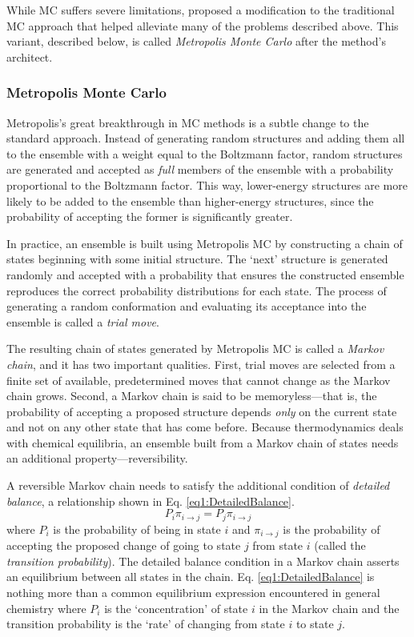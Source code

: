 While MC suffers severe limitations,
\citeauthor{Metropolis_JChemPhys_1953_v21_p1087} proposed a modification to the
traditional MC approach that helped alleviate many of the problems described
above. \cite{Metropolis_JChemPhys_1953_v21_p1087} This variant, described below,
is called \emph{Metropolis Monte Carlo} after the method's architect.

\subsubsection*{Metropolis Monte Carlo}

Metropolis's great breakthrough in MC methods is a subtle change to the standard
approach. Instead of generating random structures and adding them all to the
ensemble with a weight equal to the Boltzmann factor, random structures are
generated and accepted as \emph{full} members of the ensemble with a probability
proportional to the Boltzmann factor. This way, lower-energy structures are more
likely to be added to the ensemble than higher-energy structures, since the
probability of accepting the former is significantly greater.

In practice, an ensemble is built using Metropolis MC by constructing a chain of
states beginning with some initial structure. The `next' structure is generated
randomly and accepted with a probability that ensures the constructed ensemble
reproduces the correct probability distributions for each state. The process of
generating a random conformation and evaluating its acceptance into the ensemble
is called a \emph{trial move}.

The resulting chain of states generated by Metropolis MC is called a
\emph{Markov chain}, and it has two important qualities. First, trial moves are
selected from a finite set of available, predetermined moves that cannot change
as the Markov chain grows. Second, a Markov chain is said to be
memoryless---that is, the probability of accepting a proposed structure depends
\emph{only} on the current state and not on any other state that has come
before. Because thermodynamics deals with chemical equilibria, an ensemble built
from a Markov chain of states needs an additional property---reversibility.

A reversible Markov chain needs to satisfy the additional condition of
\emph{detailed balance}, a relationship shown in Eq. \ref{eq1:DetailedBalance}.
\begin{equation}
   P_i \pi_{i \rightarrow j} = P_j \pi_{i \rightarrow j}
   \label{eq1:DetailedBalance}
\end{equation}
where $P_i$ is the probability of being in state $i$ and $\pi_{i \rightarrow j}$
is the probability of accepting the proposed change of going to state $j$ from
state $i$ (called the \emph{transition probability}). The detailed balance
condition in a Markov chain asserts an equilibrium between all states in the
chain. Eq. \ref{eq1:DetailedBalance} is nothing more than a common equilibrium
expression encountered in general chemistry where $P_i$ is the `concentration'
of state $i$ in the Markov chain and the transition probability is the `rate' of
changing from state $i$ to state $j$.

